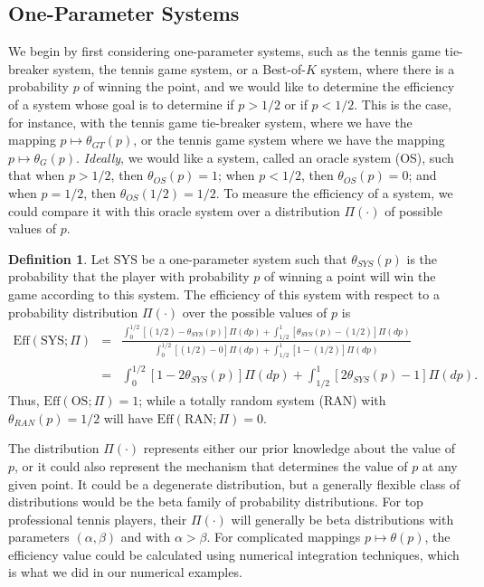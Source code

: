 \documentclass[11pt]{article}
\theoremstyle{plain}
\theoremstyle{definition}
\newtheorem{definition}{Definition}[section]
\begin{document}
\subsection{One-Parameter Systems}

We begin by first considering one-parameter systems, such as the tennis game tie-breaker system, the tennis game system, or a Best-of-$K$ system, where there is a probability $p$ of winning the point, and we would like to determine the efficiency of a system whose goal is to determine if $p > 1/2$ or if $p < 1/2$. This is the case, for instance, with the tennis game tie-breaker system, where we have the  mapping $p \mapsto \theta_{GT}(p)$, or the tennis game system where we have the mapping $p \mapsto \theta_G(p)$. {\em Ideally}, we would like a system, called an oracle system (OS), such that when $p > 1/2$, then $\theta_{OS}(p) = 1$; when $p < 1/2$, then $\theta_{OS}(p) = 0$; and when $p = 1/2$, then $\theta_{OS}(1/2) = 1/2$. To measure the efficiency of a system, we could compare it with this oracle system over a distribution $\Pi(\cdot)$ of possible values of $p$.

\begin{definition}
    Let $\mbox{SYS}$ be a one-parameter system such that $\theta_{{SYS}}(p)$ is the probability that the player with probability $p$ of winning a point will win the game according to this system. The efficiency of this system with respect to a probability distribution $\Pi(\cdot)$ over the possible values of $p$ is
    \begin{eqnarray*}
    \mbox{Eff}({\mbox{SYS}};\Pi) & = &
    \frac{\int_0^{1/2} [(1/2) - \theta_{SYS}(p)] \Pi(dp) + \int_{1/2}^1 [\theta_{SYS}(p) - (1/2)] \Pi(dp)}{\int_0^{1/2} [(1/2) - 0] \Pi(dp) + \int_{1/2}^1 [1 - (1/2)] \Pi(dp)}
   \\
    & = & \int_0^{1/2} [1 - 2\theta_{SYS}(p)] \Pi(dp) + \int_{1/2}^1 [2\theta_{SYS}(p) - 1] \Pi(dp).
     \end{eqnarray*} 
Thus, $\mbox{Eff}(\mbox{OS};\Pi) = 1$; while a totally random system (RAN) with $\theta_{{RAN}}(p) = 1/2$ will have $\mbox{Eff}(\mbox{RAN};\Pi) = 0$.   
\end{definition}

The distribution $\Pi(\cdot)$ represents either our prior knowledge about the value of $p$, or it could also represent the mechanism that determines the value of $p$ at any given point. It could be a degenerate distribution, but a generally flexible class of distributions would be the beta family of probability distributions. For top professional tennis players, their $\Pi(\cdot)$ will generally be beta distributions with parameters $(\alpha,\beta)$ and with $ \alpha > \beta$. For complicated mappings $p \mapsto \theta(p)$, the efficiency value could be calculated using numerical integration techniques, which is what we did in our numerical examples.
\end{document}
